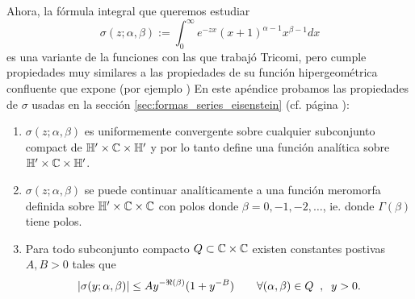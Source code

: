 Ahora, la f\'ormula integral que queremos estudiar
\[
  \sigma(z;\alpha,\beta):=\int_0^{\infty}e^{-zx}(x+1)^{\alpha-1}x^{\beta-1}dx
\]
es una variante de la funciones con las que trabaj\'o Tricomi, pero cumple propiedades muy
similares a las propiedades de su funci\'on hipergeom\'etrica confluente que expone (por
ejemplo \cite[\S2.3]{TricomiFHC}) En este ap\'endice probamos las propiedades de $\sigma$
usadas en la secci\'on \ref{sec:formas_series_eisenstein} (cf. p\'agina
\pageref{prop_func_hipergeo_conf}):

\begin{enumerate}[label=(\emph{\roman*})]%
  \label{prop_func_hipergeo_conf}
\item\label{lema:conv_unif_sigma} $\sigma(z;\alpha,\beta)$ es uniformemente convergente sobre
  cualquier subconjunto compact de $\mathbb{H}'\times\mathbb{C}\times\mathbb{H}'$ y por lo tanto define una funci\'on
  anal\'itica sobre $\mathbb{H}'\times\mathbb{C}\times\mathbb{H}'$.
  
\item\label{lema:cont_mero} $\sigma(z;\alpha,\beta)$ se puede continuar anal\'iticamente a
  una funci\'on meromorfa definida sobre $\mathbb{H}'\times\mathbb{C}\times\mathbb{C}$ con polos donde
  $\beta=0,-1,-2,\ldots$, ie. donde $\Gamma(\beta)$ tiene polos.

\item\label{lema:cota_sigma} Para todo subconjunto compacto $Q\subset\mathbb{C}\times\mathbb{C}$ existen
  constantes postivas $A,B>0$ tales que
  \[
    \left| \sigma(y;\alpha,\beta) \right| \leq Ay^{-\Re(\beta)}(1+y^{-B})
    \qquad\forall (\alpha,\beta)\in Q\;\;,\;\; y>0.
  \]
\end{enumerate}%


